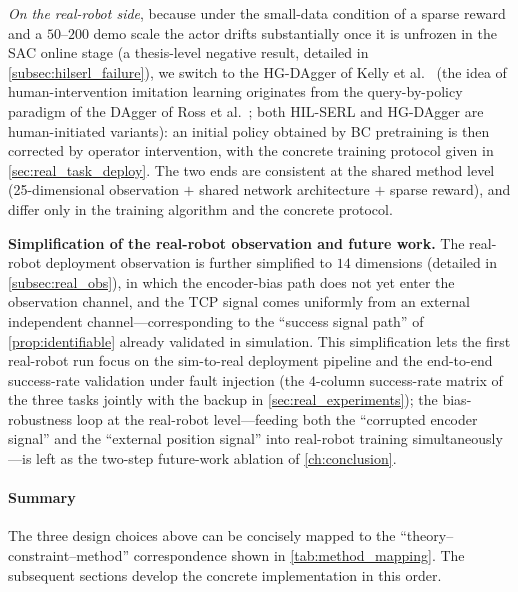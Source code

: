 \emph{On the real-robot side}, because under the small-data condition of a sparse reward and a $50$--$200$ demo scale the actor drifts substantially once it is unfrozen in the SAC online stage (a thesis-level negative result, detailed in \cref{subsec:hilserl_failure}), we switch to the HG-DAgger of Kelly et al.~\cite{kelly2019hgdagger} (the idea of human-intervention imitation learning originates from the query-by-policy paradigm of the DAgger of Ross et al.~\cite{ross2011dagger}; both HIL-SERL and HG-DAgger are human-initiated variants): an initial policy obtained by BC pretraining is then corrected by operator intervention, with the concrete training protocol given in \cref{sec:real_task_deploy}. The two ends are consistent at the shared method level (25-dimensional observation $+$ shared network architecture $+$ sparse reward), and differ only in the training algorithm and the concrete protocol.

\textbf{Simplification of the real-robot observation and future work.} The real-robot deployment observation is further simplified to $14$ dimensions (detailed in \cref{subsec:real_obs}), in which the encoder-bias path does not yet enter the observation channel, and the TCP signal comes uniformly from an external independent channel---corresponding to the ``success signal path'' of \cref{prop:identifiable} already validated in simulation. This simplification lets the first real-robot run focus on the sim-to-real deployment pipeline and the end-to-end success-rate validation under fault injection (the $4$-column success-rate matrix of the three tasks jointly with the backup in \cref{sec:real_experiments}); the bias-robustness loop at the real-robot level---feeding both the ``corrupted encoder signal'' and the ``external position signal'' into real-robot training simultaneously---is left as the two-step future-work ablation of \cref{ch:conclusion}.

\paragraph{Summary} The three design choices above can be concisely mapped to the ``theory--constraint--method'' correspondence shown in \cref{tab:method_mapping}. The subsequent sections develop the concrete implementation in this order.

